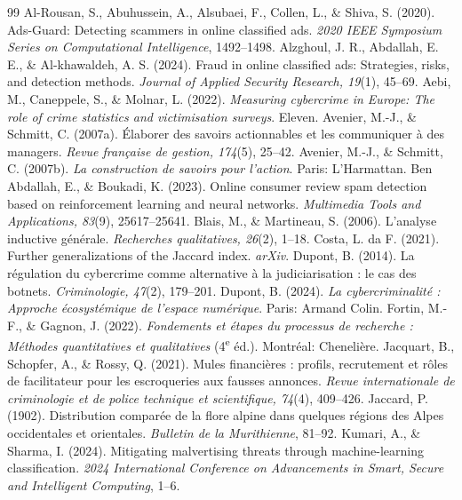 \documentclass[10pt,a4paper]{article}
\begin{document}
\begin{thebibliography}{99}
 Al-Rousan, S., Abuhussein, A., Alsubaei, F., Collen, L., \& Shiva, S. (2020). Ads-Guard: Detecting scammers in online classified ads. \emph{2020 IEEE Symposium Series on Computational Intelligence}, 1492--1498.
 Alzghoul, J. R., Abdallah, E. E., \& Al-khawaldeh, A. S. (2024). Fraud in online classified ads: Strategies, risks, and detection methods. \emph{Journal of Applied Security Research, 19}(1), 45--69.
 Aebi, M., Caneppele, S., \& Molnar, L. (2022). \emph{Measuring cybercrime in Europe: The role of crime statistics and victimisation surveys}. Eleven.
 Avenier, M.-J., \& Schmitt, C. (2007a). Élaborer des savoirs actionnables et les communiquer à des managers. \emph{Revue française de gestion, 174}(5), 25--42.
 Avenier, M.-J., \& Schmitt, C. (2007b). \emph{La construction de savoirs pour l'action}. Paris: L'Harmattan.
 Ben Abdallah, E., \& Boukadi, K. (2023). Online consumer review spam detection based on reinforcement learning and neural networks. \emph{Multimedia Tools and Applications, 83}(9), 25617--25641.
 Blais, M., \& Martineau, S. (2006). L'analyse inductive générale. \emph{Recherches qualitatives, 26}(2), 1--18.
 Costa, L. da F. (2021). Further generalizations of the Jaccard index. \emph{arXiv}.
 Dupont, B. (2014). La régulation du cybercrime comme alternative à la judiciarisation : le cas des botnets. \emph{Criminologie, 47}(2), 179--201.
 Dupont, B. (2024). \emph{La cybercriminalité : Approche écosystémique de l'espace numérique}. Paris: Armand Colin.
 Fortin, M.-F., \& Gagnon, J. (2022). \emph{Fondements et étapes du processus de recherche : Méthodes quantitatives et qualitatives} (4\textsuperscript{e} éd.). Montréal: Chenelière.
 Jacquart, B., Schopfer, A., \& Rossy, Q. (2021). Mules financières : profils, recrutement et rôles de facilitateur pour les escroqueries aux fausses annonces. \emph{Revue internationale de criminologie et de police technique et scientifique, 74}(4), 409--426.
 Jaccard, P. (1902). Distribution comparée de la flore alpine dans quelques régions des Alpes occidentales et orientales. \emph{Bulletin de la Murithienne}, 81--92.
 Kumari, A., \& Sharma, I. (2024). Mitigating malvertising threats through machine-learning classification. \emph{2024 International Conference on Advancements in Smart, Secure and Intelligent Computing}, 1--6.

\end{thebibliography}
\end{document}
